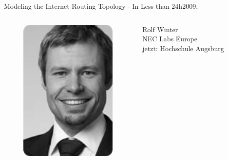 \documentclass[ngerman,compress,hyperref={bookmarks}]{beamer}
\begin{document}
\begin{frame}{Modeling the Internet Routing Topology - In Less than 24h}{2009, \cite{Winter:2009:MIR:1577959.1577976}}
\begin{columns}[c]
\begin{column}{0.09\textwidth}
\begin{figure}
        \includegraphics[width=1\textwidth]{images/winter_r}
      \end{figure}
    \end{column}
    \begin{column}{0.3\textwidth}
      {\scriptsize Rolf Winter\\
      \vspace{0.2cm}
      NEC Labs Europe\\jetzt: Hochschule Augsburg\\}
    \end{column}
  \end{columns}
\end{frame}
\end{document}
